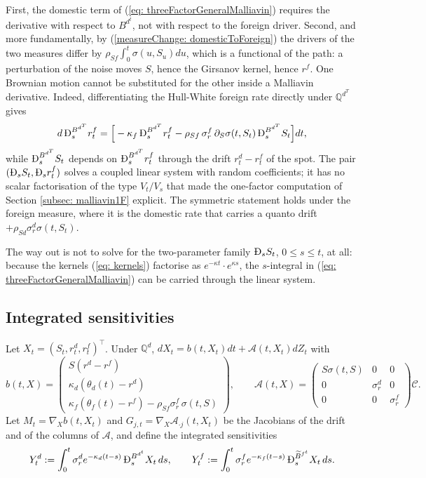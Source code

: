 First, the domestic term of (\ref{eq: threeFactorGeneralMalliavin}) requires the derivative with respect to $B^{d^t}$, not with respect to the foreign driver.
Second, and more fundamentally, by (\ref{measureChange: domesticToForeign}) the drivers of the two measures differ by $\rho_{Sf}\int_0^t\sigma(u,S_u)du$, which is a functional of the path: a perturbation of the noise moves $S$, hence the Girsanov kernel, hence $r^f$. One Brownian motion cannot be substituted for the other inside a Malliavin derivative. Indeed, differentiating the Hull-White foreign rate directly under $\mathbb{Q}^{d^T}$ gives
$$ d\,\MD^{B^{d^T}}_sr^f_t=\Big[-\kappa_f\,\MD^{B^{d^T}}_sr^f_t-\rho_{Sf}\,\sigma^f_r\,\partial_S\sigma(t,S_t)\,\MD^{B^{d^T}}_sS_t\Big]dt, $$
while $\MD^{B^{d^T}}_sS_t$ depends on $\MD^{B^{d^T}}_sr^f_t$ through the drift $r^d_t-r^f_t$ of the spot. The pair $(\MD_sS_t,\MD_sr^f_t)$ solves a coupled linear system with random coefficients; it has no scalar factorisation of the type $V_t/V_s$ that made the one-factor computation of Section \ref{subsec: malliavin1F} explicit. The symmetric statement holds under the foreign measure, where it is the domestic rate that carries a quanto drift $+\rho_{Sd}\sigma^d_r\sigma(t,S_t)$.

The way out is not to solve for the two-parameter family $\MD_sS_t$, $0\leq s\leq t$, at all: because the kernels (\ref{eq: kernels}) factorise as $e^{-\kappa t}\cdot e^{\kappa s}$, the $s$-integral in (\ref{eq: threeFactorGeneralMalliavin}) can be carried through the linear system.

\subsection{Integrated sensitivities}
Let $X_t=(S_t,r^d_t,r^f_t)^\top$. Under $\mathbb{Q}^d$, $dX_t=b(t,X_t)dt+\mathcal{A}(t,X_t)dZ_t$ with
$$ b(t,X)=\begin{pmatrix} S(r^d-r^f)\\ \kappa_d(\theta_d(t)-r^d)\\ \kappa_f(\theta_f(t)-r^f)-\rho_{Sf}\sigma^f_r\,\sigma(t,S)\end{pmatrix},\qquad
\mathcal{A}(t,X)=\begin{pmatrix} S\sigma(t,S)&0&0\\ 0&\sigma^d_r&0\\ 0&0&\sigma^f_r\end{pmatrix}\mathcal{C}. $$
Let $M_t=\nabla_Xb(t,X_t)$ and $G_{j,t}=\nabla_X\mathcal{A}_{\cdot j}(t,X_t)$ be the Jacobians of the drift and of the columns of $\mathcal{A}$, and define the integrated sensitivities
\begin{equation}\label{eq: integratedSensitivities}
Y^d_t:=\int_0^t\sigma^d_re^{-\kappa_d(t-s)}\,\MD^{B^{d^t}}_sX_t\,ds,\qquad
Y^f_t:=\int_0^t\sigma^f_re^{-\kappa_f(t-s)}\,\MD^{\widetilde{B}^{f^t}}_sX_t\,ds .
\end{equation}
